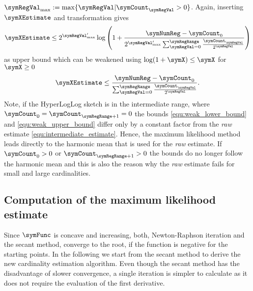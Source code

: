 \documentclass[a4paper]{scrartcl}
\begin{document}
$\symRegVal_\text{max} := \max\lbrace \symRegVal\vert\symCount_\symRegVal>0\rbrace$.
Again, inserting $\symXEstimate$ and transformation gives
\begin{equation}
\label{equ:strong_upper_bound}
\symXEstimate
\leq
2^{\symRegVal'_\text{max}}
\log\left(
1+
\frac{\symNumReg-\symCount_0}
{
2^{\symRegVal'_\text{max}}
\sum_{\symRegVal=0}^{\symRegRange}
\frac{\symCount_\symRegVal}{2^\symRegVal}
}
\right)
\end{equation}
as upper bound which can be weakened using $\log(1+\symX)\leq \symX$ for $\symX\geq 0$
\begin{equation}
\label{equ:weak_upper_bound}
\symXEstimate
\leq
\frac{\symNumReg-\symCount_0}
{\sum_{\symRegVal=0}^{\symRegRange}
\frac{\symCount_\symRegVal}{2^\symRegVal}}.
\end{equation}
Note, if the HyperLogLog sketch is in the intermediate range, where $\symCount_0=\symCount_{\symRegRange+1}=0$ the bounds \eqref{equ:weak_lower_bound} and \eqref{equ:weak_upper_bound} differ only by a constant factor from the \emph{raw} estimate \eqref{equ:intermediate_estimate}. Hence, the maximum likelihood method leads directly to the harmonic mean that is used for the \emph{raw} estimate. If $\symCount_0>0$ or $\symCount_{\symRegRange+1}>0$ the bounds do no longer follow the harmonic mean and this is also the reason why the \emph{raw} estimate fails for small and large cardinalities.

\subsection{Computation of the maximum likelihood estimate}
Since $\symFunc$ is concave and increasing, both, Newton-Raphson iteration and the secant method, converge to the root, if the function is negative for the starting points. In the following we start from the secant method to derive the new cardinality estimation algorithm. Even though the secant method has the disadvantage of slower convergence, a single iteration is simpler to calculate as it does not require the evaluation of the first derivative.
\end{document}
